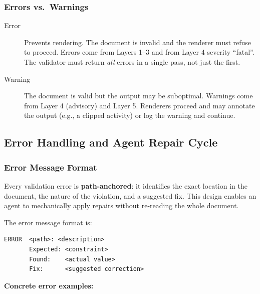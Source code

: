 \subsubsection{Errors vs.\ Warnings}

\begin{description}
  \item[Error] Prevents rendering. The document is invalid and the renderer must refuse
        to proceed. Errors come from Layers 1--3 and from Layer 4 severity ``fatal''.
        The validator must return \emph{all} errors in a single pass, not just the first.
  \item[Warning] The document is valid but the output may be suboptimal. Warnings come
        from Layer 4 (advisory) and Layer 5. Renderers proceed and may annotate the
        output (e.g., a clipped activity) or log the warning and continue.
\end{description}


\subsection{Error Handling and Agent Repair Cycle}
\label{sec:error-repair}

\subsubsection{Error Message Format}

Every validation error is \textbf{path-anchored}: it identifies the exact location in
the document, the nature of the violation, and a suggested fix. This design enables
an agent to mechanically apply repairs without re-reading the whole document.

The error message format is:

\begin{lstlisting}[caption={Validation error message format}]
ERROR  <path>: <description>
       Expected: <constraint>
       Found:    <actual value>
       Fix:      <suggested correction>
\end{lstlisting}

\textbf{Concrete error examples:}

